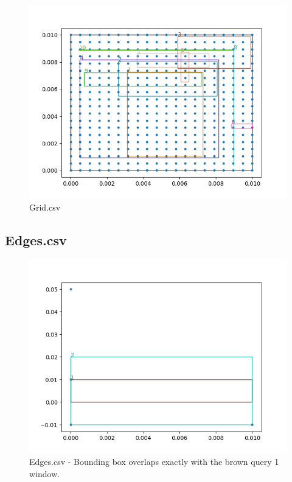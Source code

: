 \documentclass[12pt]{article}
\begin{document}
{\begin{figure}
    \centering
    \includegraphics[scale=0.8]{../img/grid.png}
    \caption{Grid.csv}
    \label{fig:my_label}
\end{figure}


\subsection{Edges.csv}

\begin{figure}
    \centering
    \includegraphics[scale=0.8]{../img/edges.png}
    \caption{Edges.csv - Bounding box overlaps exactly with the brown query 1 window.}
    \label{fig:my_label}
\end{figure}

}
\end{document}

